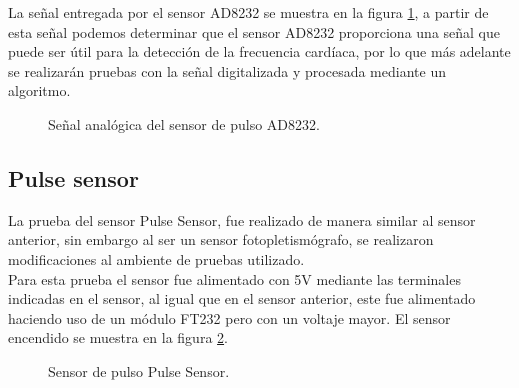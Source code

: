 La señal entregada por el sensor AD8232 se muestra en la figura \ref{fig:AD8232Osciloscopio}, a partir de esta señal podemos determinar que el sensor AD8232 proporciona una señal que puede ser útil para la detección de la frecuencia cardíaca, por lo que más adelante se realizarán pruebas con la señal digitalizada y procesada mediante un algoritmo.\\
\begin{figure}[htbp!]
	\centering
	\caption{Señal analógica del sensor de pulso AD8232.}
	\label{fig:AD8232Osciloscopio}
\end{figure}

\pagebreak

\subsection{Pulse sensor}
La prueba del sensor Pulse Sensor, fue realizado de manera similar al sensor anterior, sin embargo al ser un sensor fotopletismógrafo, se realizaron modificaciones al ambiente de pruebas utilizado.\\

Para esta prueba el sensor fue alimentado con 5V mediante las terminales indicadas en el sensor, al igual que en el sensor anterior, este fue alimentado haciendo uso de un módulo FT232 pero con un voltaje mayor. El sensor encendido se muestra en la figura \ref{fig:PulseSensor2}.

	\begin{figure}[htbp!]
		\centering
		\caption{Sensor de pulso Pulse Sensor.}
		\label{fig:PulseSensor2}
	\end{figure}
	

